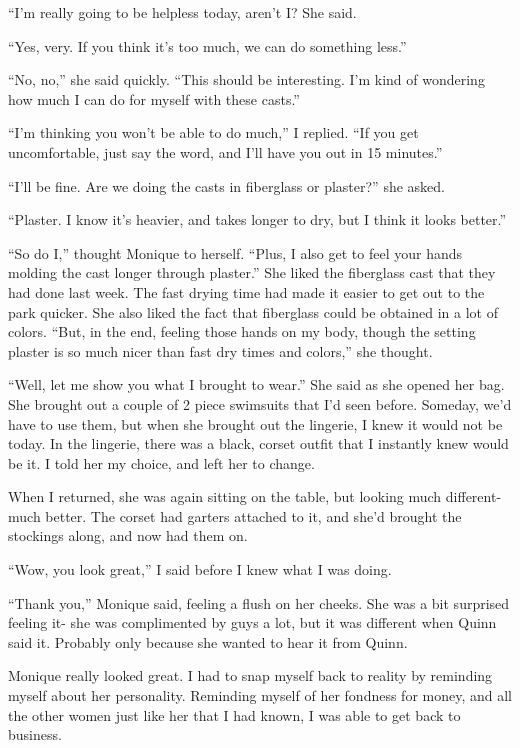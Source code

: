 ``I'm really going to be helpless today, aren't I? She said.

``Yes, very. If you think it's too much, we can do something less.''

``No, no,'' she said quickly. ``This should be interesting. I'm kind of wondering how much
I can do for myself with these casts.''

``I'm thinking you won't be able to do much,'' I replied. ``If you get uncomfortable, just
say the word, and I'll have you out in 15 minutes.''

``I'll be fine. Are we doing the casts in fiberglass or plaster?'' she asked.

``Plaster. I know it's heavier, and takes longer to dry, but I think it looks better.''

\begin{thought}
``So do I,'' thought Monique to herself. ``Plus, I also get to feel your hands molding the
cast longer through plaster.'' She liked the fiberglass cast that they had done last week. The
fast drying time had made it easier to get out to the park quicker. She also liked the fact that
fiberglass could be obtained in a lot of colors. ``But, in the end, feeling those hands on my
body, though the setting plaster is so much nicer than fast dry times and colors,'' she thought.
\end{thought}

``Well, let me show you what I brought to wear.'' She said as she opened her bag. She
brought out a couple of 2 piece swimsuits that I'd seen before. Someday, we'd have to use them,
but when she brought out the lingerie, I knew it would not be today. In the lingerie, there was
a black, corset outfit that I instantly knew would be it. I told her my choice, and left her to
change.

When I returned, she was again sitting on the table, but looking much different- much
better. The corset had garters attached to it, and she'd brought the stockings along, and now
had them on.

``Wow, you look great,'' I said before I knew what I was doing.

``Thank you,'' Monique said, feeling a flush on her cheeks. She was a bit surprised
feeling it- she was complimented by guys a lot, but it was different when Quinn said it.
Probably only because she wanted to hear it from Quinn.

Monique really looked great. I had to snap myself back to reality by reminding myself
about her personality. Reminding myself of her fondness for money, and all the other women just
like her that I had known, I was able to get back to business.

